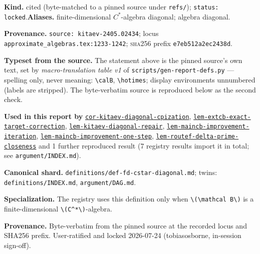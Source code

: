 \begin{defnote}
\textbf{Kind.} cited (byte-matched to a pinned source under \texttt{refs/}); \texttt{status: locked}.\quad\textbf{Aliases.} finite-dimensional $C^{*}$-algebra diagonal; algebra diagonal.
\par
\textbf{Provenance.} \texttt{source: kitaev-\allowbreak{}2405.\allowbreak{}02434}; locus \texttt{approximate\_algebras.\allowbreak{}tex:\allowbreak{}1233-\allowbreak{}1242}; \textsc{sha256} prefix \texttt{e7eb512a2ec2438d}.
\par
\textbf{Typeset from the source.} The statement above is the pinned source's own text, set by \emph{macro-translation table v1} of \texttt{scripts/gen-report-defs.py} --- spelling only, never meaning: \texttt{\textbackslash{}calB}, \texttt{\textbackslash{}hotimes}; display environments unnumbered (labels are stripped). The byte-verbatim source is reproduced below as the second check.
\par
\textbf{Used in this report by} \hyperref[cor:kitaev-diagonal-cpization]{\texttt{cor-\allowbreak{}kitaev-\allowbreak{}diagonal-\allowbreak{}cpization}}, \hyperref[lem:extcb-exact-target-correction]{\texttt{lem-\allowbreak{}extcb-\allowbreak{}exact-\allowbreak{}target-\allowbreak{}correction}}, \hyperref[lem:kitaev-diagonal-repair]{\texttt{lem-\allowbreak{}kitaev-\allowbreak{}diagonal-\allowbreak{}repair}}, \hyperref[lem:maincb-improvement-iteration]{\texttt{lem-\allowbreak{}maincb-\allowbreak{}improvement-\allowbreak{}iteration}}, \hyperref[lem:maincb-improvement-one-step]{\texttt{lem-\allowbreak{}maincb-\allowbreak{}improvement-\allowbreak{}one-\allowbreak{}step}}, \hyperref[lem:routef-delta-prime-closeness]{\texttt{lem-\allowbreak{}routef-\allowbreak{}delta-\allowbreak{}prime-\allowbreak{}closeness}} and 1 further reproduced result (7 registry results import it in total; see \texttt{argument/INDEX.md}).
\par
\textbf{Canonical shard.} \texttt{definitions/\allowbreak{}def-\allowbreak{}fd-\allowbreak{}cstar-\allowbreak{}diagonal.\allowbreak{}md}; twins: \texttt{definitions/INDEX.md}, \texttt{argument/DAG.md}.
\par
\textbf{Specialization.} The registry uses this definition only when
\texttt{\textbackslash{}(\textbackslash{}mathcal B\textbackslash{})} is a finite-dimensional \texttt{\textbackslash{}(C\textasciicircum{}*\textbackslash{})}-algebra.

\textbf{Provenance.} Byte-verbatim from the pinned source at the recorded locus and
SHA256 prefix.  User-ratified and locked 2026-07-24 (tobiasosborne, in-session sign-off).
\end{defnote}
